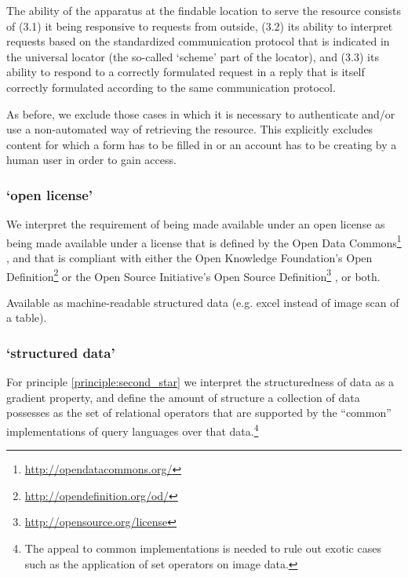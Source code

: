 The ability of the apparatus at the findable location to serve
the resource consists of
 (3.1) it being responsive to requests from outside,
 (3.2) its ability to interpret requests based on
 the standardized communication protocol that is indicated in
 the universal locator (the so-called `scheme' part of the locator), and
 (3.3) its ability to respond to a correctly formulated request
 in a reply that is itself correctly formulated according to the same
 communication protocol.

As before, we exclude those cases in which it is necessary
 to authenticate and/or use a non-automated way
 of retrieving the resource.
This explicitly excludes content for which a form has to be filled in
 or an account has to be creating by a human user
 in order to gain access.

\subsubsection*{`open license'}

We interpret the requirement of being made available under an open license
 as being made available under a license that is defined by
 the Open Data Commons\footnote{\url{http://opendatacommons.org/}} \cite{miller2008open},
 and that is compliant with either
 the Open Knowledge Foundation's Open Definition\footnote{\url{http://opendefinition.org/od/}}
 or the Open Source Initiative's
 Open Source Definition\footnote{\url{http://opensource.org/license}} \cite{rosen2004open},
 or both.

\begin{principle}
  \label{principle:second_star}
  Available as machine-readable structured data
   (e.g. excel instead of image scan of a table).
\end{principle}

\subsubsection*{`structured data'}

For principle \ref{principle:second_star} we interpret
 the structuredness of data as a gradient property,
 and define the amount of structure a collection of data possesses
 as the set of relational operators that are supported by
 the ``common'' implementations of query languages
 over that data.\footnote{The appeal to common implementations
  is needed to rule out exotic cases such as the application
  of set operators on image data.}

